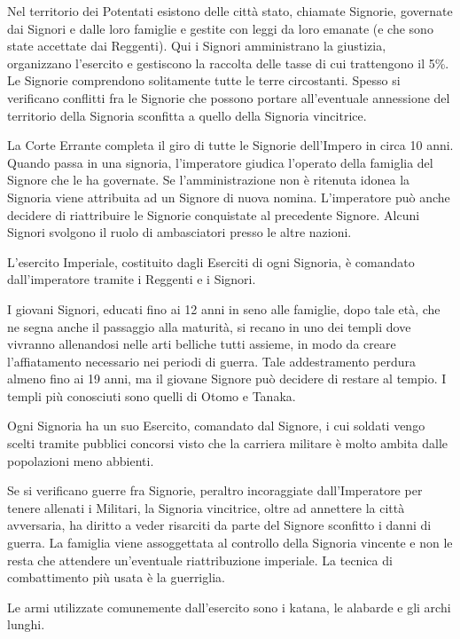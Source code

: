 Nel territorio dei Potentati esistono delle citt\`a stato, chiamate
Signorie, governate dai Signori e dalle loro famiglie e gestite con
leggi da loro emanate (e che sono state accettate dai Reggenti). Qui i
Signori amministrano la giustizia, organizzano l'esercito e gestiscono
la raccolta delle tasse di cui trattengono il 5\%. Le Signorie
comprendono solitamente tutte le terre circostanti. Spesso si
verificano conflitti fra le Signorie che possono portare
all'eventuale annessione del territorio della Signoria sconfitta a
quello della Signoria vincitrice.

La Corte Errante completa il giro di tutte le Signorie dell'Impero in
circa 10 anni. Quando passa in una signoria, l'imperatore giudica
l'operato della famiglia del Signore che le ha governate. Se
l'amministrazione non \`e ritenuta idonea la Signoria viene attribuita
ad un Signore di nuova nomina.  L'imperatore pu\`o anche decidere di
riattribuire le Signorie conquistate al precedente Signore. Alcuni
Signori svolgono il ruolo di ambasciatori presso le altre nazioni.

\Esercito L'esercito Imperiale, costituito dagli Eserciti di ogni
Signoria, \`e comandato dall'imperatore tramite i Reggenti e i
Signori. 

I giovani Signori, educati fino ai 12 anni in seno alle famiglie, dopo
tale et\`a, che ne segna anche il passaggio alla maturit\`a, si recano
in uno dei templi dove vivranno allenandosi nelle arti belliche tutti
assieme, in modo da creare l'affiatamento necessario nei periodi di
guerra. Tale addestramento perdura almeno fino ai 19 anni, ma il
giovane Signore pu\`o decidere di restare al tempio. I templi pi\`u
conosciuti sono quelli di Otomo e Tanaka. 

Ogni Signoria ha un suo Esercito, comandato dal Signore, i cui soldati
vengo scelti tramite pubblici concorsi visto che la carriera militare
\`e molto ambita dalle popolazioni meno abbienti.

Se si verificano guerre fra Signorie, peraltro incoraggiate
dall'Imperatore per tenere allenati i Militari, la Signoria
vincitrice, oltre ad annettere la citt\`a avversaria, ha diritto a
veder risarciti da parte del Signore sconfitto i danni di guerra. La
famiglia viene assoggettata al controllo della Signoria vincente e non
le resta che attendere un'eventuale riattribuzione imperiale. La
tecnica di combattimento pi\`u usata \`e la guerriglia.

Le armi utilizzate comunemente dall'esercito sono i katana, le
alabarde e gli archi lunghi. 

